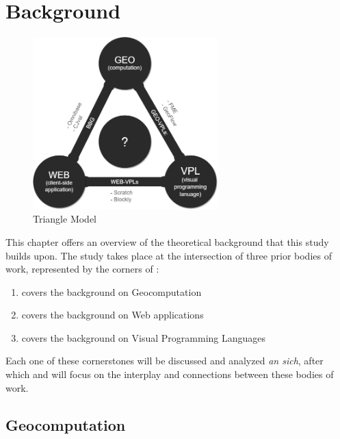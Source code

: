 
\chapter{Background}
\label{chap:background}

\begin{figure}
  \centering
  \graphicspath{ {../../assets/diagrams/} }
  \includegraphics[width=270px]{geo-web-vpl.png}
  \caption{Triangle Model}
  \label{fig:triangle-model}
\end{figure}

This chapter offers an overview of the theoretical background that this study builds upon.
The study takes place at the intersection of three prior bodies of work,  represented by the corners of :
\begin{enumerate}[-]
  \item {} covers the background on Geocomputation
  \item {} covers the background on Web applications
  \item {} covers the background on Visual Programming Languages
\end{enumerate}
Each one of these cornerstones will be discussed and analyzed \emph{an sich}, after which  and  will focus on the interplay and connections between these bodies of work. 

\section{Geocomputation}
\label{sec:background-geo}

